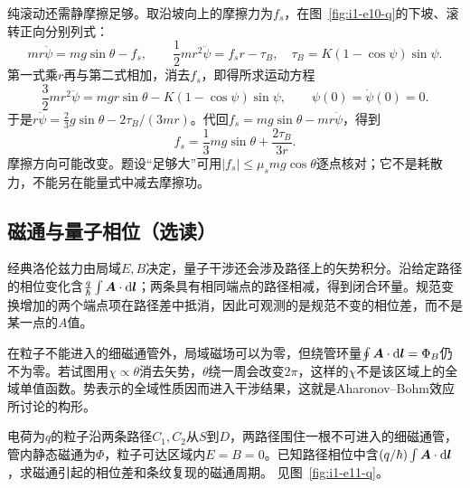 \begin{solution}
纯滚动还需静摩擦足够。取沿坡向上的摩擦力为$f_s$，在图~\ref{fig:i1-e10-q}的下坡、滚转正向分别列式：
\[mr\ddot\psi=mg\sin\theta-f_s,\qquad
\frac12mr^2\ddot\psi=f_sr-\tau_B,
\quad \tau_B=K(1-\cos\psi)\sin\psi.\]
第一式乘$r$再与第二式相加，消去$f_s$，即得所求运动方程
\[\boxed{\frac32mr^2\ddot\psi
=mgr\sin\theta-K(1-\cos\psi)\sin\psi},\qquad
\psi(0)=\dot\psi(0)=0.\]
于是$r\ddot\psi=\tfrac23g\sin\theta-2\tau_B/(3mr)$。代回$f_s=mg\sin\theta-mr\ddot\psi$，得到
\[f_s=\frac13mg\sin\theta+\frac{2\tau_B}{3r}.
\]
摩擦方向可能改变。题设“足够大”可用$|f_s|\le\mu_smg\cos\theta$逐点核对；它不是耗散力，不能另在能量式中减去摩擦功。
\end{solution}

\subsection{磁通与量子相位（选读）}
经典洛伦兹力由局域$E,B$决定，量子干涉还会涉及路径上的矢势积分。沿给定路径的相位变化含$\frac q\hbar\int\bm{A}\cdot\mathop{}\!\mathrm d\bm{l}$；两条具有相同端点的路径相减，得到闭合环量。规范变换增加的两个端点项在路径差中抵消，因此可观测的是规范不变的相位差，而不是某一点的$A$值。

在粒子不能进入的细磁通管外，局域磁场可以为零，但绕管环量$\oint\bm{A}\cdot\mathop{}\!\mathrm d\bm{l}=\Phi_B$仍不为零。若试图用$\chi\propto\theta$消去矢势，$\theta$绕一周会改变$2\pi$，这样的$\chi$不是该区域上的全域单值函数。势表示的全域性质因而进入干涉结果，这就是Aharonov--Bohm效应所讨论的构形。

\begin{example}[磁通管外的相位差]\label{ex:i1-e11}
电荷为$q$的粒子沿两条路径$C_1,C_2$从$S$到$D$，两路径围住一根不可进入的细磁通管，管内静态磁通为$\Phi$，粒子可达区域内$E=B=0$。已知路径相位中含$(q/\hbar)\int\bm{A}\cdot\mathop{}\!\mathrm d\bm{l}$，求磁通引起的相位差和条纹复现的磁通周期。 见图~\ref{fig:i1-e11-q}。
\end{example}

